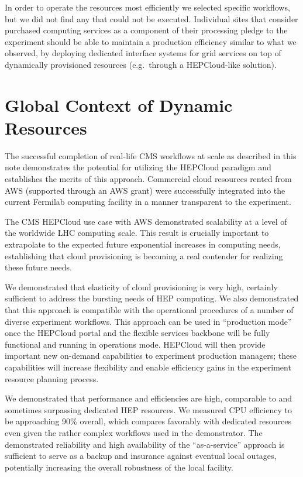 \documentclass[twocolumn]{svjour3}          %
\begin{document}
In order to operate the resources most efficiently we selected specific workflows, but we did not find any that could not be executed.   Individual sites that consider purchased computing services as a component of their processing pledge to the experiment should be able to maintain a production efficiency similar to what we observed, by deploying dedicated interface systems for grid services on top of dynamically provisioned resources (e.g.\ through a HEPCloud-like solution).
%
\section{Global Context of Dynamic Resources}

The successful completion of real-life CMS workflows at scale as described in this note demonstrates the potential for utilizing the HEPCloud paradigm and establishes the merits of this approach. Commercial cloud resources rented from AWS (supported through an AWS grant) were successfully integrated into the current Fermilab computing facility in a manner transparent to the experiment.

The CMS HEPCloud use case with AWS demonstrated scalability at a level of the worldwide LHC computing scale. This result is crucially important to  extrapolate to the expected future exponential increases in computing needs, establishing that cloud provisioning is becoming a real contender for realizing these future needs.

We demonstrated that elasticity of cloud provisioning is very high, certainly sufficient to address the bursting needs of HEP computing. We also demonstrated that this approach is compatible with the operational procedures of a number of diverse experiment workflows. This approach can be used in ``production mode'' once the HEPCloud portal and the flexible services backbone will be fully functional and running in operations mode.  HEPCloud will then provide important new on-demand capabilities to experiment production managers; these capabilities will increase flexibility and enable efficiency gains in the experiment resource planning process.

We demonstrated that performance and efficiencies are high, comparable to and sometimes surpassing dedicated HEP resources. We measured CPU efficiency to be approaching 90\% overall, which compares favorably with dedicated resources even given the rather complex workflows used in the demonstrator. The demonstrated reliability and high availability of the ``as-a-service'' approach is sufficient to serve as a backup and insurance against eventual local outages, potentially increasing the overall robustness of the local facility.
\end{document}
